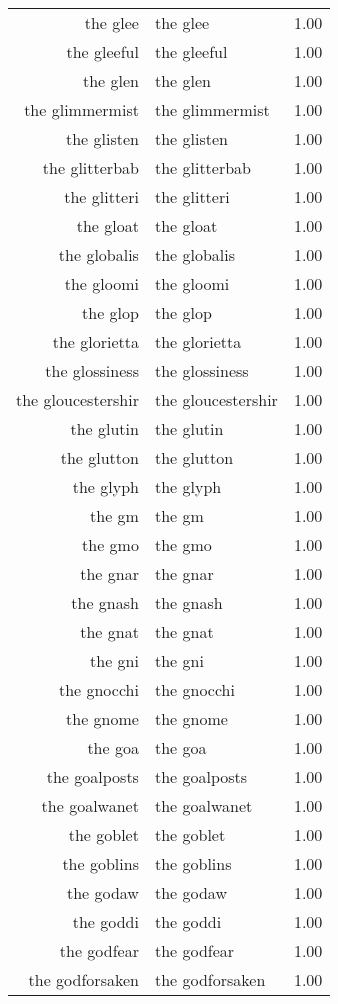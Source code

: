 \begin{table}[ht]
\begin{tabular}{rlr}
  the glee & the glee & 1.00 \\ 
  the gleeful & the gleeful & 1.00 \\ 
  the glen & the glen & 1.00 \\ 
  the glimmermist & the glimmermist & 1.00 \\ 
  the glisten & the glisten & 1.00 \\ 
  the glitterbab & the glitterbab & 1.00 \\ 
  the glitteri & the glitteri & 1.00 \\ 
  the gloat & the gloat & 1.00 \\ 
  the globalis & the globalis & 1.00 \\ 
  the gloomi & the gloomi & 1.00 \\ 
  the glop & the glop & 1.00 \\ 
  the glorietta & the glorietta & 1.00 \\ 
  the glossiness & the glossiness & 1.00 \\ 
  the gloucestershir & the gloucestershir & 1.00 \\ 
  the glutin & the glutin & 1.00 \\ 
  the glutton & the glutton & 1.00 \\ 
  the glyph & the glyph & 1.00 \\ 
  the gm & the gm & 1.00 \\ 
  the gmo & the gmo & 1.00 \\ 
  the gnar & the gnar & 1.00 \\ 
  the gnash & the gnash & 1.00 \\ 
  the gnat & the gnat & 1.00 \\ 
  the gni & the gni & 1.00 \\ 
  the gnocchi & the gnocchi & 1.00 \\ 
  the gnome & the gnome & 1.00 \\ 
  the goa & the goa & 1.00 \\ 
  the goalposts & the goalposts & 1.00 \\ 
  the goalwanet & the goalwanet & 1.00 \\ 
  the goblet & the goblet & 1.00 \\ 
  the goblins & the goblins & 1.00 \\ 
  the godaw & the godaw & 1.00 \\ 
  the goddi & the goddi & 1.00 \\ 
  the godfear & the godfear & 1.00 \\ 
  the godforsaken & the godforsaken & 1.00 \\ 

\end{tabular}
\end{table}
